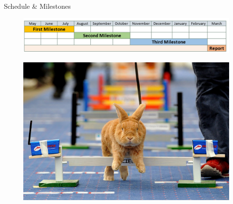 \begin{frame}{Schedule \& Milestones}
\begin{figure}
	\includegraphics[scale=0.55]{Pictures/FirstHalf/timeline.png}
	\end{figure}
\end{frame}


\begin{frame}
\begin{figure}
	\includegraphics[scale=0.68]{Pictures/FirstHalf/bunny.png}
\end{figure}
\end{frame}

